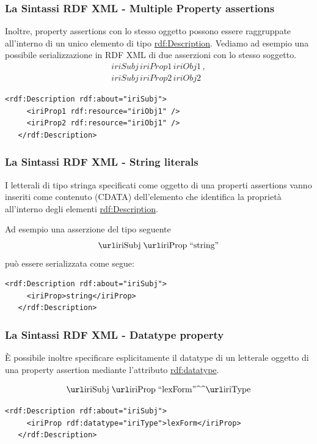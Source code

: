 \documentclass[8pt]{beamer}
\begin{document}
\begin{frame}[fragile]
 \frametitle{La Sintassi RDF XML - Multiple Property assertions}
 
 
 Inoltre, property assertions con lo stesso oggetto possono essere 
 raggruppate all'interno di un unico elemento di tipo \url{rdf:Description}.
 Vediamo ad esempio una possibile serializzazione in RDF XML di due asserzioni 
 con lo stesso soggetto.
\[
\begin{array}{l}
 iriSubj\,iriProp1\,iriObj1 \,, \\
 iriSubj\,iriProp2\,iriObj2
\end{array}
\]

\begin{Verbatim}[fontsize=\small]
   <rdf:Description rdf:about="iriSubj">
     <iriProp1 rdf:resource="iriObj1" />
     <iriProp2 rdf:resource="iriObj1" />
   </rdf:Description>
\end{Verbatim}
\end{frame}

\begin{frame}[fragile]
 \frametitle{La Sintassi RDF XML - String literals}
I letterali di tipo stringa specificati come oggetto di una 
properti assertions vanno inseriti come contenuto (CDATA) dell'elemento
che identifica la propriet\`a all'interno degli elementi \url{rdf:Description}.

Ad esempio una asserzione del tipo seguente
\[
 \triple{iriSubj}{iriProp}{\stringLiteral{string}}
\]
pu\`o essere serializzata come segue:
\vspace{\baselineskip}

\begin{Verbatim}[fontsize=\small]
   <rdf:Description rdf:about="iriSubj">
     <iriProp>string</iriProp>
   </rdf:Description>
\end{Verbatim}
\end{frame}

\begin{frame}[fragile]
 \frametitle{La Sintassi RDF XML - Datatype property}
\`E possibile inoltre specificare esplicitamente il datatype di un
letterale oggetto di una property assertion mediante l'attributo \url{rdf:datatype}.

\[
 \triple{iriSubj}{iriProp}{\literal{lexForm}{iriType}}
\]
\vspace{\baselineskip}

\begin{Verbatim}[fontsize=\small]
   <rdf:Description rdf:about="iriSubj">
     <iriProp rdf:datatype="iriType">lexForm</iriProp>
   </rdf:Description>
\end{Verbatim}
\end{frame}
\end{document}
